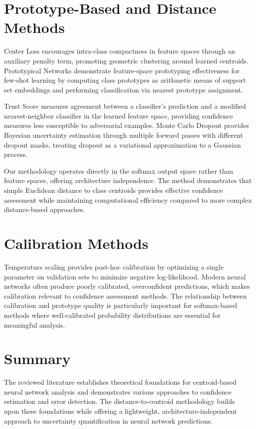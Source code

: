 \section{Prototype-Based and Distance Methods}

Center Loss \cite{Wen2016} encourages intra-class compactness in feature spaces through an auxiliary penalty term, promoting geometric clustering around learned centroids. Prototypical Networks \cite{Snell2017} demonstrate feature-space prototyping effectiveness for few-shot learning by computing class prototypes as arithmetic means of support set embeddings and performing classification via nearest prototype assignment.

Trust Score \cite{Jiang2018} measures agreement between a classifier's prediction and a modified nearest-neighbor classifier in the learned feature space, providing confidence measures less susceptible to adversarial examples. Monte Carlo Dropout \cite{Gal2016} provides Bayesian uncertainty estimation through multiple forward passes with different dropout masks, treating dropout as a variational approximation to a Gaussian process.

Our methodology operates directly in the softmax output space rather than feature spaces, offering architecture independence. The method demonstrates that simple Euclidean distance to class centroids provides effective confidence assessment while maintaining computational efficiency compared to more complex distance-based approaches.

\section{Calibration Methods}

Temperature scaling \cite{Guo2017} provides post-hoc calibration by optimizing a single parameter on validation sets to minimize negative log-likelihood. Modern neural networks often produce poorly calibrated, overconfident predictions, which makes calibration relevant to confidence assessment methods. The relationship between calibration and prototype quality is particularly important for softmax-based methods where well-calibrated probability distributions are essential for meaningful analysis.

\section{Summary}

The reviewed literature establishes theoretical foundations for centroid-based neural network analysis and demonstrates various approaches to confidence estimation and error detection. The distance-to-centroid methodology builds upon these foundations while offering a lightweight, architecture-independent approach to uncertainty quantification in neural network predictions.

